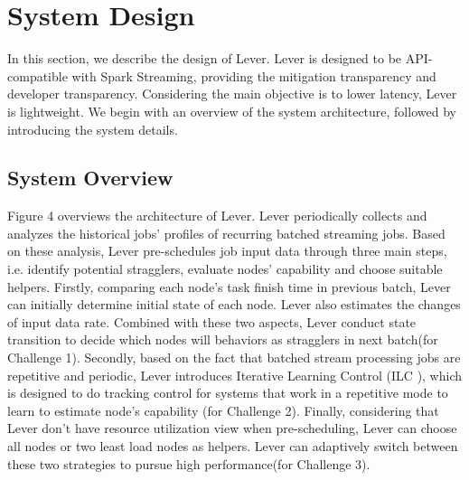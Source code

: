 \section{System Design}

  In this section, we describe the design of Lever. Lever is designed to be API-compatible with Spark Streaming, providing the mitigation transparency and developer transparency. Considering the main objective is to lower latency, Lever is lightweight. We begin with an overview of the system architecture, followed by introducing the system details.

\subsection{System Overview}

  Figure 4 overviews the architecture of Lever. Lever periodically collects and analyzes the historical jobs' profiles of recurring batched streaming jobs. Based on these analysis, Lever pre-schedules job input data through three main steps, i.e. identify potential stragglers, evaluate nodes' capability and choose suitable helpers. Firstly, comparing each node's task finish time in previous batch, Lever can initially determine initial state of each node. Lever also estimates the changes of input data rate. Combined with these two aspects, Lever conduct state transition to decide which nodes will behaviors as stragglers in next batch(for Challenge 1). Secondly, based on the fact that batched stream processing jobs are repetitive and periodic, Lever introduces Iterative Learning Control (ILC \cite{Arimoto}), which is designed to do tracking control for systems that work in a repetitive mode to learn to estimate node's capability (for Challenge 2). Finally, considering that Lever don't have resource utilization view when pre-scheduling, Lever can choose all nodes or two least load nodes as helpers. Lever can adaptively switch between these two strategies to pursue high performance(for Challenge 3).

